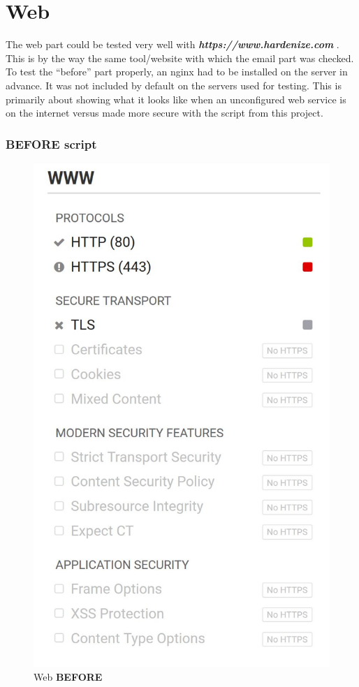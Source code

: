\section{Web}
The web part could be tested very well with \textbf{\textit{https://www.hardenize.com}} \cite{hardenize}. This is by the way the same tool/website with which the email part was checked.
\newline To test the ``before'' part properly, an nginx had to be installed on the server in advance. It was not included by default on the servers used for testing. 
This is primarily about showing what it looks like when an unconfigured web service is on the internet versus made more secure with the script from this project.

\subsubsection{BEFORE script}
\begin{figure}[H]
	\centering
	\includegraphics[width=0.66\linewidth]{pics/hardenize_web_before}
	\caption{Web \textbf{BEFORE}}
	\label{fig:beforeWeb}
\end{figure}


